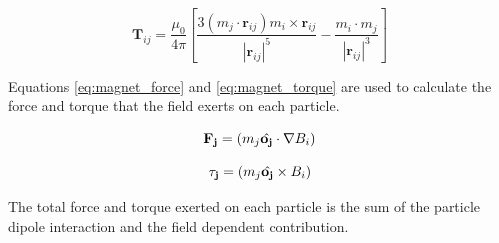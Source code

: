 \begin{equation}
    \mathbf{T}_{ij} = \frac{\mu_0}{4 \pi}[ \frac{3(m_j \cdot \mathbf{r}_{ij})m_i \times \mathbf{r}_{ij} }
    {|\mathbf{r}_{ij}|^5} - \frac{m_i \cdot m_j }{|\mathbf{r}_{ij}|^3} ]
    \label{eq:dipole_magnetic_torque}
\end{equation}

Equations \ref{eq:magnet_force} and \ref{eq:magnet_torque} are used to calculate the force and torque that the 
field exerts on each particle.

\begin{equation}
    \mathbf{F_{j}} = (m_j \Hat{\mathbf{o_j}} \cdot \nabla B_i)
    \label{eq:magnet_force}
\end{equation}

\begin{equation}
    \mathbf{\tau_j} = (m_j \Hat{\mathbf{o_j}} \times B_i)
    \label{eq:magnet_torque}
\end{equation}

The total force and torque exerted on each particle is the sum of the particle dipole interaction and the field 
dependent contribution. 